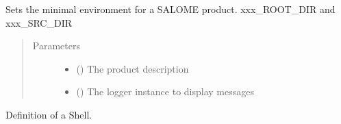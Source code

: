 \documentclass[a4paper,10pt,english]{sphinxmanual}
\begin{document}
\begin{fulllineitems}
\begin{fulllineitems}
\begin{quote}
\begin{description}
\end{description}\end{quote}

\end{fulllineitems}


\begin{fulllineitems}
\label{\detokenize{commands/apidoc/src:src.environment.SalomeEnviron.set_salome_minimal_product_env}}
Sets the minimal environment for a SALOME product.
xxx\_ROOT\_DIR and xxx\_SRC\_DIR
\begin{quote}\begin{description}
\item[{Parameters}] \leavevmode\begin{itemize}
\item {} 
 () \textendash{} The product description

\item {} 
 () \textendash{} The logger instance to display messages

\end{itemize}

\end{description}\end{quote}

\end{fulllineitems}


\end{fulllineitems}


\begin{fulllineitems}
\label{\detokenize{commands/apidoc/src:src.environment.Shell}}
Definition of a Shell.

\end{fulllineitems}

\end{document}
